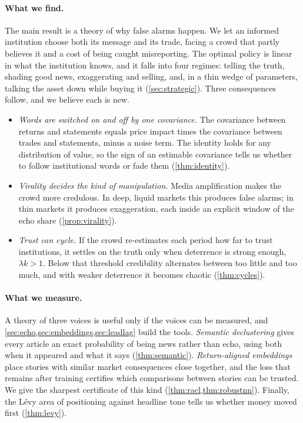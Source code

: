 \documentclass[11pt,a4paper]{article}
\theoremstyle{plain}
\theoremstyle{definition}
\theoremstyle{remark}
\begin{document}
\paragraph{What we find.} The main result is a theory of why false alarms happen. We let an informed institution choose both its message and its trade, facing a crowd that partly believes it and a cost of being caught misreporting. The optimal policy is linear in what the institution knows, and it falls into four regimes: telling the truth, shading good news, exaggerating and selling, and, in a thin wedge of parameters, talking the asset down while buying it (\cref{sec:strategic}). Three consequences follow, and we believe each is new.
\begin{itemize}
  \item \emph{Words are switched on and off by one covariance.} The covariance between returns and statements equals price impact times the covariance between trades and statements, minus a noise term. The identity holds for any distribution of value, so the sign of an estimable covariance tells us whether to follow institutional words or fade them (\cref{thm:identity}).
  \item \emph{Virality decides the kind of manipulation.} Media amplification makes the crowd more credulous. In deep, liquid markets this produces false alarms; in thin markets it produces exaggeration, each inside an explicit window of the echo share (\cref{prop:virality}).
  \item \emph{Trust can cycle.} If the crowd re-estimates each period how far to trust institutions, it settles on the truth only when deterrence is strong enough, $\lambda k>1$. Below that threshold credibility alternates between too little and too much, and with weaker deterrence it becomes chaotic (\cref{thm:cycles}).
\end{itemize}

\paragraph{What we measure.} A theory of three voices is useful only if the voices can be measured, and \cref{sec:echo,sec:embeddings,sec:leadlag} build the tools. \emph{Semantic declustering} gives every article an exact probability of being news rather than echo, using both when it appeared and what it says (\cref{thm:semantic}). \emph{Return-aligned embeddings} place stories with similar market consequences close together, and the loss that remains after training certifies which comparisons between stories can be trusted. We give the sharpest certificate of this kind (\cref{thm:racl,thm:robustnn}). Finally, the L\'evy area of positioning against headline tone tells us whether money moved first (\cref{thm:levy}).
\end{document}
